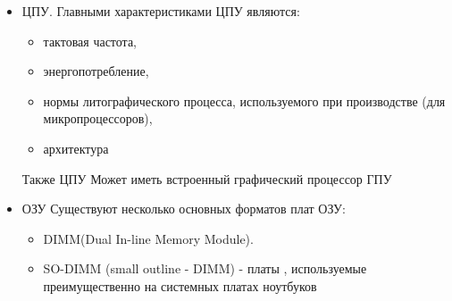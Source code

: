 \begin{itemize}
\begin{itemize}
\begin{itemize}
                        разъемы для подключения устройств ввода-вывода звука: для аналоговых сигналов и цифровых (S\/PDIF)
                    \item 
                        разъемы подключения устаревших устройств ввода-вывода (мышь, клавиатура) PS\/2
                    \item
                        COM-порт (последовательный порт), LTP (параллельный порт)
                    \item
                        и т.д.
                \end{itemize}
                (некоторые разъемы могут устанавливаться на плату с внутренней стороны, например COM-порт или USB)
            \item 
                ЦПУ.
                Главными характеристиками ЦПУ являются: 
                \begin{itemize}
                    \item 
                        тактовая частота, 
                    \item 
                        энергопотребление, 
                    \item 
                        нормы литографического процесса, используемого при производстве (для микропроцессоров), 
                    \item 
                        архитектура
                \end{itemize}
                Также ЦПУ Может иметь встроенный графический процессор ГПУ
            \item 
                ОЗУ
                Существуют несколько основных форматов плат ОЗУ:
                \begin{itemize}
                    \item 
                        DIMM(Dual In-line Memory Module). 
                    \item 
                        SO-DIMM (small outline - DIMM) - платы , используемые преимущественно на системных платах ноутбуков
                \end{itemize}


\end{itemize}
\end{itemize}
